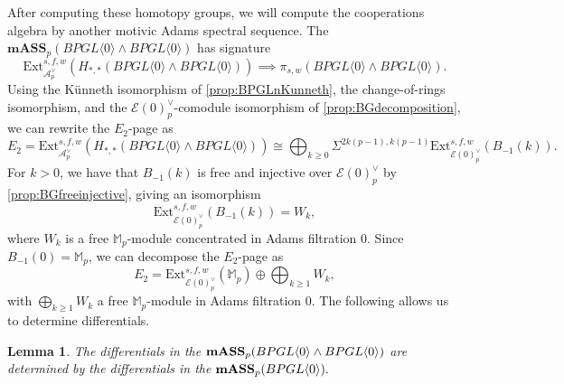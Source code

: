 \documentclass{amsart}
\newtheorem{lemma}[theorem]{Lemma}
\theoremstyle{plain}
\numberwithin{theorem}{section}
\numberwithin{equation}{section}
\numberwithin{figure}{section}
\newcommand{\0}{\langle 0 \rangle }
\begin{document}
After computing these homotopy groups, we will compute the cooperations algebra by another motivic Adams spectral sequence. The $\textbf{mASS}_p(BPGL \langle 0 \rangle \wedge BPGL \langle 0 \rangle)$ has signature
\[\text{Ext}^{s,f,w}_{\mathcal{A}_p^\vee}(H_{*,*}(BPGL \langle 0 \rangle \wedge BPGL \langle 0 \rangle)) \implies \pi_{s,w}(BPGL \langle 0 \rangle \wedge BPGL \langle 0 \rangle).\]
Using the K\"unneth isomorphism of \cref{prop:BPGLnKunneth}, the change-of-rings isomorphism, and the $\mathcal{E}(0)_p^\vee$-comodule isomorphism of \cref{prop:BGdecomposition}, we can rewrite the $E_2$-page as
\[E_2= \text{Ext}^{s,f,w}_{\mathcal{A}_p^\vee}(H_{*,*}(BPGL \langle 0 \rangle \wedge BPGL \langle 0 \rangle)) \cong \bigoplus_{k \geq 0}\Sigma^{2k(p-1), k(p-1)}\text{Ext}^{s,f,w}_{\mathcal{E}(0)_p^\vee}(B_{-1}(k)).\]
For $k > 0$, we have that $B_{-1}(k)$ is free and injective over $\mathcal{E}(0)_p^\vee$ by \cref{prop:BGfreeinjective}, giving an isomorphism 
\[\text{Ext}^{s,f,w}_{\mathcal{E}(0)_p^\vee}(B_{-1}(k))=W_k,\] 
where $W_k$ is a free $\mathbb{M}_p$-module  concentrated in Adams filtration 0. Since $B_{-1}(0)=\mathbb{M}_p$, we can decompose the $E_2$-page as
\begin{equation}
\label{e2-mass BPGL0 coop}
E_2=\text{Ext}^{s,f,w}_{\mathcal{E}(0)_p^\vee}(\mathbb{M}_p) \oplus \bigoplus_{k \geq 1}W_k,
\end{equation}
with $\bigoplus_{k \geq 1}W_k$ a free $\mathbb{M}_p$-module in Adams filtration 0. The following allows us to determine differentials.
\begin{lemma}
\label{BPGL0 coop mass differentials}
    The differentials in the $\textup{\textbf{mASS}}_p(BPGL \langle 0 \rangle \wedge BPGL \langle 0 \rangle)$ are determined by the differentials in the $\textup{\textbf{mASS}}_p(BPGL \langle 0 \rangle).$
\end{lemma}
\end{document}
